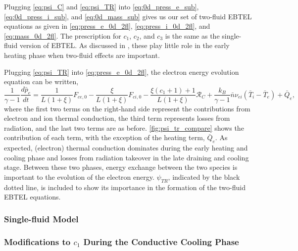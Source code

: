 Plugging \autoref{eq:psi_C} and \autoref{eq:psi_TR} into \autoref{eq:0d_press_e_sub}, \autoref{eq:0d_press_i_sub}, and \autoref{eq:0d_mass_sub} gives us our set of two-fluid EBTEL equations as given in \autoref{eq:press_e_0d_2fl}, \autoref{eq:press_i_0d_2fl}, and \autoref{eq:mass_0d_2fl}. The prescription for $c_1$, $c_2$, and $c_3$ is the same as the single-fluid version of EBTEL. As discussed in \citet{cargill_enthalpy-based_2012}, these play little role in the early heating phase when two-fluid effects are important.


Plugging \autoref{eq:psi_TR} into \autoref{eq:press_e_0d_2fl}, the electron energy evolution equation can be written,
\begin{equation}
    \frac{1}{\gamma -1}\frac{d\bar{p}_e}{dt} = \frac{1}{L(1+\xi)}F_{ce,0} - \frac{\xi}{L(1+\xi)}F_{ci,0} - \frac{\xi(c_1+1) + 1}{L(1+\xi)}\mathcal{R}_C + \frac{k_B}{\gamma-1}\bar{n}\nu_{ei}(\bar{T}_i-\bar{T}_e) + \bar{Q}_e,
    \label{eq:press_e_0d_2fl_breakdown}
\end{equation}
where the first two terms on the right-hand side represent the contributions from electron and ion thermal conduction, the third term represents losses from radiation, and the last two terms are as before. \autoref{fig:psi_tr_compare} shows the contribution of each term, with the exception of the heating term, $\bar{Q}_e$. As expected, (electron) thermal conduction dominates during the early heating and cooling phase and losses from radiation takeover in the late draining and cooling stage. Between these two phases, energy exchange between the two species is important to the evolution of the electron energy. $\psi_{TR}$, indicated by the black dotted line, is included to show its importance in the formation of the two-fluid EBTEL equations.

\subsubsection{Single-fluid Model}\label{sec:ebtel-single-fluid}


\subsubsection{Modifications to $c_1$ During the Conductive Cooling Phase}\label{sec:c1-correction}

